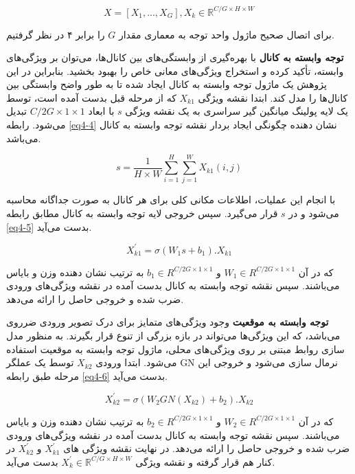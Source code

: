 \begin{equation}
X = [X_1, ..., X_G], X_k \in \mathbb{R}^{C/G \times H \times W}
\label{eq4-3}
\end{equation}

\noindent
برای اتصال صحیح ماژول واحد توجه به معماری  مقدار $G$ را برابر ۴ در نظر گرفتیم.

\textbf{توجه  وابسته به کانال}
با بهره‌گیری از وابستگی‌های بین کانال‌ها، می‌توان بر ویژگی‌های وابسته، تأکید کرده و استخراج ویژگی‌های معانی خاص را بهبود بخشید. بنابراین در این پژوهش یک ماژول توجه وابسته به کانال ایجاد شده تا به طور واضح وابستگی بین کانال‌ها را مدل کند. ابتدا نقشه ویژگی $X_{k1}$ که از مرحله قبل بدست آمده است، توسط یک لایه پولینگ میانگین گیر سراسری  به یک نقشه ویژگی $s$ با ابعاد $C/2G \times 1 \times 1$ تبدیل می‌شود. رابطه \ref{eq4-4} نشان دهنده چگونگی ایجاد بردار نقشه توجه وابسته به کانال می‌باشد. 

\begin{equation}
s = \frac{1}{H \times W}\sum_{i=1}^{H} \sum_{j=1}^{W} X_{k1} (i, j)
\label{eq4-4}
\end{equation}

\noindent
با انجام این عملیات، اطلاعات مکانی کلی برای هر کانال به صورت جداگانه محاسبه می‌شود و در $s$ قرار می‌گیرد. سپس خروجی لایه توجه وابسته به کانال مطابق رابطه \ref{eq4-5} بدست ‌می‌آید. 

\begin{equation}
X^{\prime}_{k1} = \sigma(W_1 s + b_1) . X_{k1}
\label{eq4-5}
\end{equation}

\noindent
که در آن $W_1\in R^{C/2G \times 1 \times 1} $  و  $b_1\in R^{C/2G \times 1 \times 1} $ به ترتیب نشان دهنده وزن و بایاس می‌باشند. ‌‌‌سپس نقشه توجه وابسته به کانال بدست آمده در نقشه ویژگی‌های ورودی ضرب شده و خروجی حاصل را ارائه می‌دهد.

\textbf{توجه وابسته به موقعیت}
وجود ویژگی‌های متمایز برای درک تصویر ورودی ضرروی می‌باشد، که این ویژگی‌ها می‌تواند در بازه بزرگی از تنوع قرار بگیرند. به منظور مدل سازی روابط مبتنی  بر روی ویژگی‌های محلی، ماژول توجه وابسته به موقعیت استفاده می‌شود. ابتدا ورودی $X_{k2}$ توسط یک عملگر GN  نرمال سازی می‌شود و خروجی این مرحله طبق رابطه \ref{eq4-6} بدست می‌آید.

\begin{equation}
X^{\prime}_{k2} = \sigma(W_2 GN(X_{k2}) + b_2) . X_{k2}
\label{eq4-6}
\end{equation}

\noindent
که در آن $W_2\in R^{C/2G \times 1 \times 1} $  و  $b_2\in R^{C/2G \times 1 \times 1} $ به ترتیب نشان دهنده وزن و بایاس می‌باشند. ‌‌‌سپس نقشه توجه وابسته به کانال بدست آمده در نقشه ویژگی‌های ورودی ضرب شده و خروجی حاصل را ارائه می‌دهد. در نهایت نقشه ویژگی های  $X^{\prime}_{k1}$ و $X^{\prime}_{k2}$ در کنار هم قرار گرفته و نقشه ویژگی 
$X^{\prime}_{k} \in \mathbb{R}^{C/G \times H \times W}$
بدست می‌آید. 

